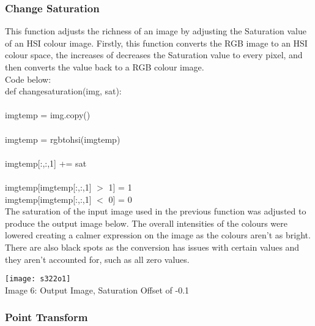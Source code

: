 \documentclass{article}
\begin{document}
	\subsubsection{Change Saturation}
	
	This function adjusts the richness of an image by adjusting the Saturation value of an HSI colour image. Firstly, this function converts the RGB image to an HSI colour space, the increases of decreases the Saturation value to every pixel, and then converts the value back to a RGB colour image.\\
	
	Code below:\\
	
	\noindent def change\textunderscore saturation(img, sat):\\
	\\
	\indent img\textunderscore temp = img.copy()\\
	\\
	\indent img\textunderscore temp = rgb\textunderscore to\textunderscore hsi(img\textunderscore temp)\\
	\\
	\indent img\textunderscore temp[:,:,1] += sat\\
	\\
	\indent img\textunderscore temp[img\textunderscore temp[:,:,1] $>$ 1] = 1\\
	\indent img\textunderscore temp[img\textunderscore temp[:,:,1] $<$ 0] = 0\\
	
	The saturation of the input image used in the previous function was adjusted to produce the output image below. The overall intensities of the colours were lowered creating a calmer expression on the image as the colours aren't as bright. There are also black spots as the conversion has issues with certain values and they aren't accounted for, such as all zero values.\\
	
	\begin{center}
		\noindent \texttt{[image: s322o1]}\\
		Image 6: Output Image, Saturation Offset of -0.1\\
	\end{center}
	
	\subsubsection{Point Transform}
\end{document}
